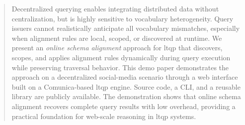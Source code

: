 \begin{abstract}
Decentralized  querying enables integrating distributed data without centralization, but is highly sensitive to vocabulary heterogeneity.
Query issuers cannot realistically anticipate all vocabulary mismatches, especially when alignment rules are local, scoped, or discovered at runtime.
We present an \emph{online schema alignment} approach for \acrfull{ltqp} that discovers, scopes, and applies alignment rules dynamically during query execution while preserving traversal behavior.
This demo paper demonstrates the approach on a decentralized social-media scenario through a web interface built on a Comunica-based \acrshort{ltqp} engine.
Source code, a CLI, and a reusable library are publicly available.
The demonstration shows that online schema alignment recovers complete query results with low overhead, providing a practical foundation for web-scale reasoning in \acrshort{ltqp} systems.
\end{abstract}
